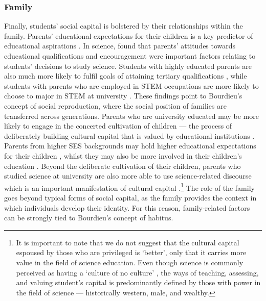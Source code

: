 \subsubsection*{Family}
Finally, students' social capital is bolstered by their relationships within the family. Parents' educational expectations for their children is a key predictor of educational aspirations \citep{wu2015early}. In science, \cite{Lyons_2006} found that parents' attitudes towards educational qualifications and encouragement were important factors relating to students' decisions to study science. Students with highly educated parents are also much more likely to fulfil goals of attaining tertiary qualifications \citep{reynolds2011change}, while students with parents who are employed in STEM occupations are more likely to choose to major in STEM at university \citep{moakler2014college}. These findings point to Bourdieu's concept of social reproduction, where the social position of families are transferred across generations. Parents who are university educated may be more likely to engage in the concerted cultivation of children --- the process of deliberately building cultural capital that is valued by educational institutions \citep{lareau2011unequal}. Parents from higher SES backgrounds may hold higher educational expectations for their children \citep{carolan2015does}, whilst they may also be more involved in their children's education \citep{cheadle2011quantitative}.  Beyond the deliberate cultivation of their children, parents who studied science at university are also more able to use science-related discourse which is an important manifestation of cultural capital \citep{Lyons_2006,bernstein1971class}.\footnote{It is important to note that we do not suggest that the cultural capital espoused by those who are privileged is `better', only that it carries more value in the field of science education. Even though science is commonly perceived as having a `culture of no culture' \citep{traweek2009beamtimes}, the ways of teaching, assessing, and valuing student's capital is predominantly defined by those with power in the field of science --- historically western, male, and wealthy.}  The role of the family goes beyond typical forms of social capital, as the family provides the context in which individuals develop their identity. For this reason, family-related factors can be strongly tied to Bourdieu's concept of habitus.  

